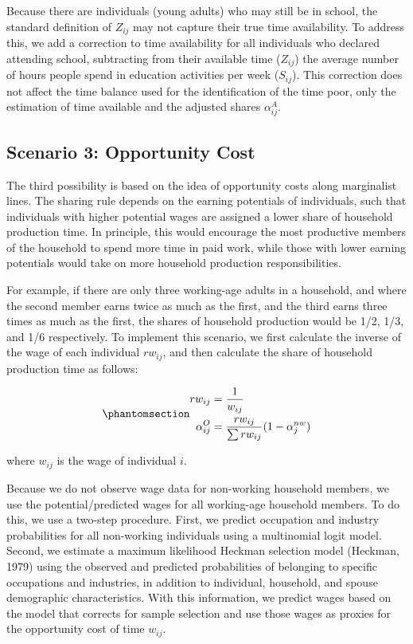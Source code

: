 \documentclass[
  11pt,
]{article}
\begin{document}
Because there are individuals (young adults) who may still be in school,
the standard definition of \(Z_{ij}\) may not capture their true time
availability. To address this, we add a correction to time availability
for all individuals who declared attending school, subtracting from
their available time (\(Z_{ij}\)) the average number of hours people
spend in education activities per week (\(S_{ij}\)). This correction
does not affect the time balance used for the identification of the time
poor, only the estimation of time available and the adjusted shares
\(\alpha_{ij}^A\).

\subsection{Scenario 3: Opportunity
Cost}\label{scenario-3-opportunity-cost}

The third possibility is based on the idea of opportunity costs along
marginalist lines. The sharing rule depends on the earning potentials of
individuals, such that individuals with higher potential wages are
assigned a lower share of household production time. In principle, this
would encourage the most productive members of the household to spend
more time in paid work, while those with lower earning potentials would
take on more household production responsibilities.

For example, if there are only three working-age adults in a household,
and where the second member earns twice as much as the first, and the
third earns three times as much as the first, the shares of household
production would be 1/2, 1/3, and 1/6 respectively. To implement this
scenario, we first calculate the inverse of the wage of each individual
\(rw_{ij}\), and then calculate the share of household production time
as follows:

\begin{equation}\phantomsection\label{eq-r3}{\begin{aligned}
rw_{ij} &= \frac{1}{w_{ij}} \\
\alpha_{ij}^O &= \frac{rw_{ij}}{\sum rw_{ij}} (1-\alpha_{j}^{nw})
\end{aligned}
}\end{equation}

where \(w_{ij}\) is the wage of individual \(i\).

Because we do not observe wage data for non-working household members,
we use the potential/predicted wages for all working-age household
members. To do this, we use a two-step procedure. First, we predict
occupation and industry probabilities for all non-working individuals
using a multinomial logit model. Second, we estimate a maximum
likelihood Heckman selection model (Heckman, 1979) using the observed
and predicted probabilities of belonging to specific occupations and
industries, in addition to individual, household, and spouse demographic
characteristics. With this information, we predict wages based on the
model that corrects for sample selection and use those wages as proxies
for the opportunity cost of time \(w_{ij}\).
\end{document}
